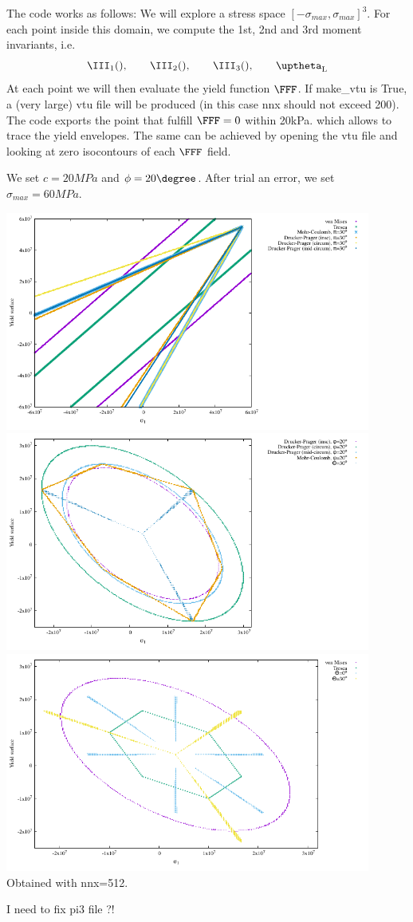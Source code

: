 The code works as follows: We will explore a stress space $[-\sigma_{max},\sigma_{max}]^3$.
For each point inside this domain, we compute the 1st, 2nd and 3rd moment invariants, i.e.
\[
\III_1(), \qquad \III_2(), \qquad \III_3(), \qquad \uptheta_{\rm L}
\] 
At each point we will then evaluate the yield function $\FFF$. 
If {\python make\_vtu} is True, a (very large) vtu file will be produced (in this 
case nnx should not exceed 200).
The code exports the point that fulfill $\FFF=0$ within 20kPa. 
which allows to trace the yield envelopes.
The same can be achieved by opening the vtu file and looking at zero isocontours of each $\FFF$ field.

We set $c=20MPa$ and $\phi=20\degree$. After trial an error, we set $\sigma_{max}=60MPa$.

\begin{center}
\includegraphics[width=12cm]{python_codes/fieldstone_159/images/surfaces_xy.pdf}
\includegraphics[width=12cm]{python_codes/fieldstone_159/images/surfaces_plane.pdf}
\includegraphics[width=12cm]{python_codes/fieldstone_159/images/surfaces_plane2.pdf}\\
{\captionfont Obtained with nnx=512}.
\end{center}

I need to fix pi3 file ?!




